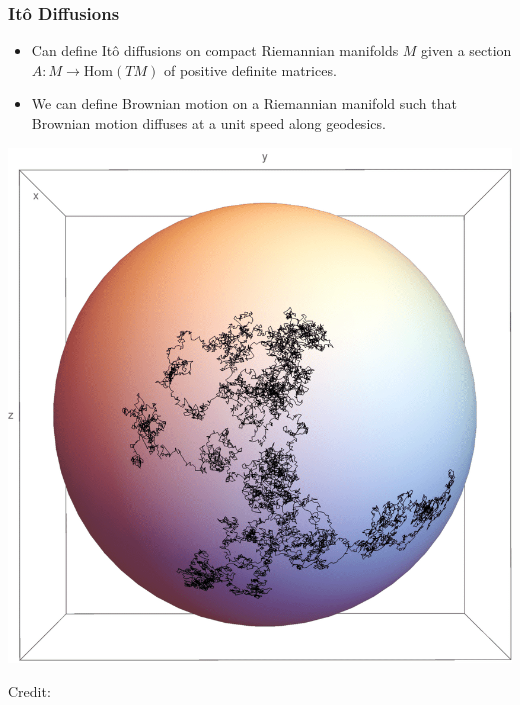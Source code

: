 \documentclass[usenames,dvipsnames,12pt]{beamer}
\begin{document}
\begin{frame}
    \frametitle{It\^{o} Diffusions}

    \begin{itemize}
        \item Can define It\^{o} diffusions on compact Riemannian manifolds $M$ given a section $A: M \to \text{Hom}(TM)$ of positive definite matrices.

        \pause
        \item We can define Brownian motion on a Riemannian manifold such that Brownian motion diffuses at a unit speed along geodesics.
    \end{itemize}

    \begin{center}
        \includegraphics[scale=0.1]{BrownianMotionSphere.png}

        \hspace*{10pt}\hbox{\scriptsize Credit:}
    \end{center}
\end{frame}
\end{document}
